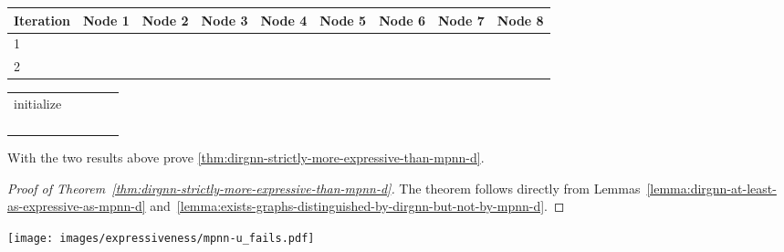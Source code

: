 \documentclass{article}
\newcommand\oursacro{Dir-GNN}
\theoremstyle{plain}
\theoremstyle{definition}
\theoremstyle{remark}
\begin{document}
\begin{table*}[t]
\vskip 0.15in
\begin{center}
\begin{small}
\begin{sc}
\begin{tabular}{l||cccc|cccc}
\toprule
Iteration     & Node 1  & Node 2 & Node 3 & Node 4 & Node 5  & Node 6 & Node 7 & Node 8 \\
\midrule
1             &        &       &       &       &        &       &       &       \\
2             &        &       &       &       &        &       &       &       \\
\bottomrule
\end{tabular}

\begin{tabular}{lcccr}
\toprule
                                               &    \\
\midrule
initialize                                           &                           \\
             &                           \\
                     &                           \\
                           &                           \\
                    &                           \\
\bottomrule
\end{tabular}

\end{sc}
\end{small}
\end{center}
\caption{Node colorings at different iterations, as well as the  hash function, when applying D-WL to the two graphs in~\cref{fig:mpnn-d_fails}.}
\label{tab:wl-d-1}
\end{table*}




 
With the two results above prove \cref{thm:dirgnn-strictly-more-expressive-than-mpnn-d}.

\begin{proof}[Proof of Theorem~\ref{thm:dirgnn-strictly-more-expressive-than-mpnn-d}]
    The theorem follows directly from Lemmas~\ref{lemma:dirgnn-at-least-as-expressive-as-mpnn-d} and~\ref{lemma:exists-graphs-distinguished-by-dirgnn-but-not-by-mpnn-d}.
\end{proof}

\begin{figure*}
    \centering
    \texttt{[image: images/expressiveness/mpnn-u\_fails.pdf]}
    \caption{Two non-isomorphic directed graphs that cannot be distinguished by any MPNN-U model but can be distinguished by \oursacro{}.}
    \label{fig:mpnn-u_fails}
\end{figure*}
\end{document}

